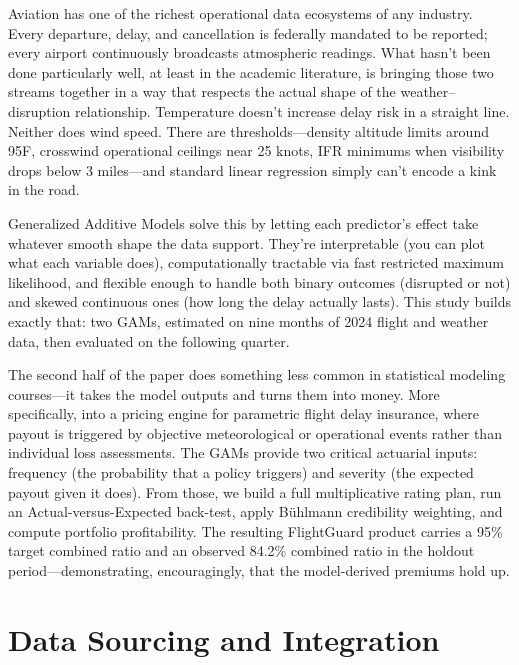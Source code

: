 \documentclass[12pt, a4paper]{article}
\begin{document}
Aviation has one of the richest operational data ecosystems of any industry. Every departure, delay, and cancellation is federally mandated to be reported; every airport continuously broadcasts atmospheric readings. What hasn't been done particularly well, at least in the academic literature, is bringing those two streams together in a way that respects the actual shape of the weather--disruption relationship. Temperature doesn't increase delay risk in a straight line. Neither does wind speed. There are thresholds---density altitude limits around 95\textdegree F, crosswind operational ceilings near 25 knots, IFR minimums when visibility drops below 3 miles---and standard linear regression simply can't encode a kink in the road.

Generalized Additive Models \citep{wood2017} solve this by letting each predictor's effect take whatever smooth shape the data support. They're interpretable (you can plot what each variable does), computationally tractable via fast restricted maximum likelihood, and flexible enough to handle both binary outcomes (disrupted or not) and skewed continuous ones (how long the delay actually lasts). This study builds exactly that: two GAMs, estimated on nine months of 2024 flight and weather data, then evaluated on the following quarter.

The second half of the paper does something less common in statistical modeling courses---it takes the model outputs and turns them into money. More specifically, into a pricing engine for parametric flight delay insurance, where payout is triggered by objective meteorological or operational events rather than individual loss assessments. The GAMs provide two critical actuarial inputs: frequency (the probability that a policy triggers) and severity (the expected payout given it does). From those, we build a full multiplicative rating plan, run an Actual-versus-Expected back-test, apply Bühlmann credibility weighting, and compute portfolio profitability. The resulting FlightGuard product carries a 95\% target combined ratio and an observed 84.2\% combined ratio in the holdout period---demonstrating, encouragingly, that the model-derived premiums hold up.

\section{Data Sourcing and Integration}
\label{sec:data}
\end{document}
